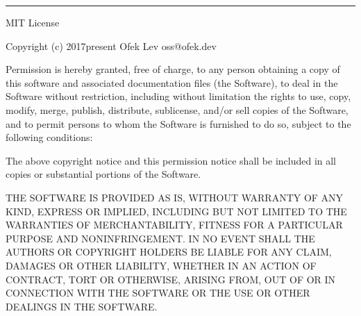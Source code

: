 \documentclass[letterpaper,10pt,english]{sphinxmanual}
\begin{document}
\begin{flushright}



\end{flushright}


\bigskip\hrule\bigskip




\begin{sphinxVerbatim}[commandchars=\\\{\}]
MIT License

Copyright (c) 2017\PYGZhy{}present Ofek Lev \PYGZlt{}oss@ofek.dev\PYGZgt{}

Permission is hereby granted, free of charge, to any person obtaining a copy of this software and associated documentation files (the \PYGZdq{}Software\PYGZdq{}), to deal in the Software without restriction, including without limitation the rights to use, copy, modify, merge, publish, distribute, sublicense, and/or sell copies of the Software, and to permit persons to whom the Software is furnished to do so, subject to the following conditions:

The above copyright notice and this permission notice shall be included in all copies or substantial portions of the Software.

THE SOFTWARE IS PROVIDED \PYGZdq{}AS IS\PYGZdq{}, WITHOUT WARRANTY OF ANY KIND, EXPRESS OR IMPLIED, INCLUDING BUT NOT LIMITED TO THE WARRANTIES OF MERCHANTABILITY, FITNESS FOR A PARTICULAR PURPOSE AND NONINFRINGEMENT. IN NO EVENT SHALL THE AUTHORS OR COPYRIGHT HOLDERS BE LIABLE FOR ANY CLAIM, DAMAGES OR OTHER LIABILITY, WHETHER IN AN ACTION OF CONTRACT, TORT OR OTHERWISE, ARISING FROM, OUT OF OR IN CONNECTION WITH THE SOFTWARE OR THE USE OR OTHER DEALINGS IN THE SOFTWARE.
\end{sphinxVerbatim}




\renewcommand{\indexname}{Index}
\printindex
\end{document}
